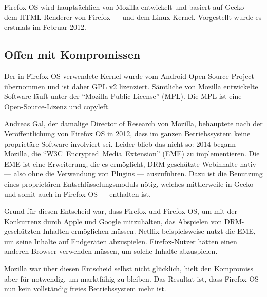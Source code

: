 Firefox OS wird hauptsächlich von Mozilla entwickelt und basiert auf Gecko --- dem HTML-Renderer von Firefox --- und dem Linux Kernel\thinspace\cite{online:ff-architecture}. Vorgestellt wurde es erstmals im Februar 2012\thinspace\cite{online:ff-techhive-b2g}.
\newline

\subsection{Offen mit Kompromissen}
Der in Firefox OS verwendete Kernel wurde vom Android Open Source Project übernommen und ist daher GPL v2 lizenziert\thinspace\cite{online:kernel-license}. Sämtliche von Mozilla entwickelte Software läuft unter der ``\mbox{Mozilla} Public License'' (MPL)\thinspace\cite{online:mozilla-licensing}. Die MPL ist eine \mbox{Open-Source-Lizenz} und copyleft\thinspace\cite{online:mpl}.

Andreas Gal, der damalige Director of Research von Mozilla, behauptete nach der Veröffentlichung von Firefox OS in 2012, dass im ganzen Betriebssystem keine proprietäre Software involviert sei\thinspace\cite{online:knowyourmobile-b2g}. Leider blieb das nicht so: 2014 begann Mozilla, die ``\mbox{W3C Encrypted Media Extension}'' (EME) zu implementieren\thinspace\cite{online:mozilla-eme}. Die EME  ist eine Erweiterung, die es ermöglicht, \mbox{DRM-geschützte} Webinhalte nativ --- also ohne die Verwendung von Plugins --- auszuführen. Dazu ist die Benutzung eines proprietären Entschlüsselungsmoduls nötig\thinspace\cite{online:mozilla-eme}, welches mittlerweile in Gecko --- und somit auch in Firefox OS --- enthalten ist.

Grund für diesen Entscheid war, dass Firefox und Firefox OS, um mit der Konkurrenz durch Apple und Google mitzuhalten, das Abspielen von \mbox{DRM-geschützten} Inhalten ermöglichen müssen. Netflix beispielsweise nutzt die EME, um seine Inhalte auf Endgeräten abzuspielen. Firefox-Nutzer hätten einen anderen Browser verwenden müssen, um solche Inhalte abzuspielen\thinspace\cite{online:mozilla-eme}.

Mozilla war über diesen Entscheid selbst nicht glücklich\thinspace\cite{online:ff-drm-implementation}, hielt den Kompromiss aber für notwendig, um marktfähig zu bleiben. Das Resultat ist, dass Firefox OS nun kein vollständig freies Betriebssystem mehr ist. 
\newline

